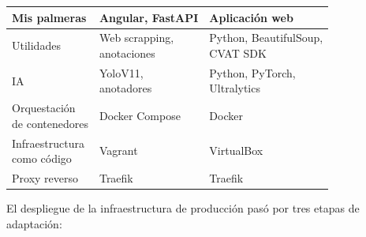 \begin{table}[H]
\begin{tabular}{l l l}
    Mis palmeras     & Angular, FastAPI            & Aplicación web                     \\ \hline
    Utilidades       & \makecell[l]{Web scrapping,                                      \\anotaciones}  & \makecell[l]{Python, BeautifulSoup, \\CVAT SDK}    \\ \hline
    IA               & \makecell[l]{YoloV11,                                            \\anotadores}                     & \makecell[l]{Python, PyTorch, \\Ultralytics}    \\ \hline
    \makecell[l]{Orquestación                                                           \\de contenedores} & Docker Compose                          & Docker                          \\ \hline
    \makecell[l]{Infraestructura                                                        \\como código}  & Vagrant                                 & VirtualBox \citep{wikipedia_virtualbox_2025}                     \\ \hline
    Proxy reverso    & Traefik                     & Traefik                            \\ \hline
    \bottomrule
    \hline
  \end{tabular}
  \label{tab:tecnologias}
\end{table}

El despliegue de la infraestructura de producción pasó por tres etapas de adaptación:

